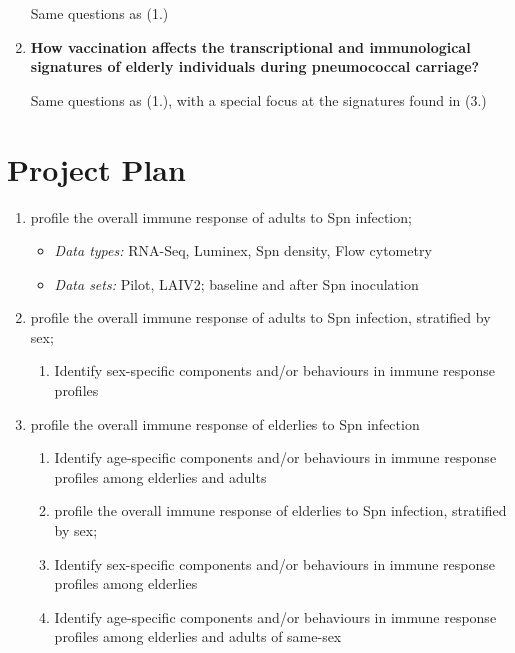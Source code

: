 \documentclass[
]{book}
\providecommand{\tightlist}{%
  \setlength{\itemsep}{0pt}\setlength{\parskip}{0pt}}
\begin{document}
\begin{enumerate}
  Same questions as (1.)
\item
  \textbf{How vaccination affects the transcriptional and immunological signatures of elderly individuals during pneumococcal carriage?}

  Same questions as (1.), with a special focus at the signatures found in (3.)
\end{enumerate}

\hypertarget{project-plan}{%
\chapter{Project Plan}\label{project-plan}}

\begin{enumerate}
\def\labelenumi{\arabic{enumi}.}
\item
  profile the overall immune response of adults to Spn infection;

  \begin{itemize}
  \item
    \emph{Data types:} RNA-Seq, Luminex, Spn density, Flow cytometry
  \item
    \emph{Data sets:} Pilot, LAIV2; baseline and after Spn inoculation
  \end{itemize}
\item
  profile the overall immune response of adults to Spn infection, stratified by sex;

  \begin{enumerate}
  \def\labelenumii{\arabic{enumii}.}
  \tightlist
  \item
    Identify sex-specific components and/or behaviours in immune response profiles
  \end{enumerate}
\item
  profile the overall immune response of elderlies to Spn infection

  \begin{enumerate}
  \def\labelenumii{\arabic{enumii}.}
  \item
    Identify age-specific components and/or behaviours in immune response profiles among elderlies and adults
  \item
    profile the overall immune response of elderlies to Spn infection, stratified by sex;
  \item
    Identify sex-specific components and/or behaviours in immune response profiles among elderlies
  \item
    Identify age-specific components and/or behaviours in immune response profiles among elderlies and adults of same-sex
  \end{enumerate}


\end{enumerate}
\end{document}
